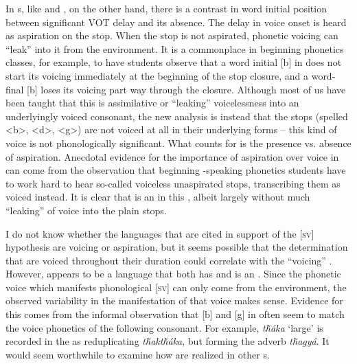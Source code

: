 \documentclass[output=paper]{LSP/langsci}
\begin{document}
In s, like  and , on the other hand, there is a contrast in word initial position between significant VOT delay and its absence. The delay in voice onset is heard as aspiration on the stop. When the stop is not aspirated, phonetic voicing can ``leak'' into it from the environment. It is a commonplace in beginning phonetics classes, for example, to have students observe that a word initial [b] in  does not start its voicing immediately at the beginning of the stop closure, and a word-final [b] loses its voicing part way through the closure. Although most of us have been taught that this is assimilative or ``leaking'' voicelessness into an underlyingly voiced consonant, the new analysis is instead that the stops (spelled <b>, <d>, <g>) are not voiced at all in their underlying forms -- this kind of voice is not phonologically significant. What counts for  is the presence vs. absence of aspiration. Anecdotal evidence for the importance of aspiration over voice in  can come from the observation that beginning -speaking phonetics students have to work hard to hear so-called voiceless unaspirated stops, transcribing them as voiced instead. It is clear that  is an  in this , albeit largely without much ``leaking'' of voice into the plain stops.

I do not know whether the languages that are cited in support of the [\textsc{sv}] hypothesis are voicing or aspiration, but it seems possible that the determination that  are voiced throughout their duration could correlate with the ``voicing'' . However,  appears to be a language that both has  and is an . Since the phonetic voice which manifests phonological [\textsc{sv}] can only come from the environment, the observed variability in the manifestation of that voice makes sense. Evidence for this comes from the informal observation that [b] and [g] in  often seem to match the voice phonetics of the following consonant. For example, \textit{t\v{h}\'aka} `large' is recorded in the  as reduplicating \textit{t\v{h}akt\v{h}\'aka}, but forming the adverb \textit{t\v{h}agy\'a}. It would seem worthwhile to examine how  are realized in other s.
\end{document}
